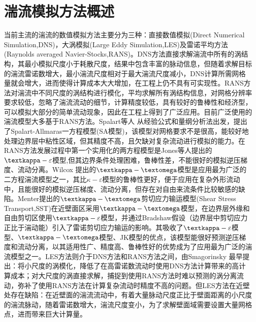 \section{湍流模拟方法概述}
当前主流的湍流的数值模拟方法主要分为三种：直接数值模拟(Direct Numerical Simulation,DNS)，大涡模拟(Large Eddy Simulation,LES)及雷诺平均方法(Raynolds averaged Navier-Stocks,RANS)。DNS方法直接求解湍流中所有的涡结构，其最小模拟尺度小于耗散尺度，结果中包含丰富的脉动信息，但随着求解目标的湍流雷诺数增大，最小湍流尺度相对于最大湍流尺度减小，DNS计算所需网格量就会增大，进而使得计算成本大大增加，在工程上仍不具有可实现性。RANS方法对湍流中不同尺度的涡结构进行模化，平均求解所有涡结构信息，对网格分辨率要求较低，忽略了湍流流动的细节，计算精度较低，具有较好的鲁棒性和经济型，可以模拟大部分的简单流动现象，因此在工程上得到了广泛应用。目前广泛使用的湍流模型大多基于RANS方法。Spalart等人 从经验公式和量纲分析法出发，提出了Spalart-Allmaras一方程模型(SA模型)，该模型对网格要求不是很高，能较好地处理边界层中粘性区域，但其精度不高，且欠缺对复杂流动进行模拟的能力。在RANS方法发展过程中第一个实用化的两方程模型是Jones等人提出的$\textkappa-\varepsilon$模型,但其边界条件处理困难，鲁棒性差，不能很好的模拟逆压梯度、流动分离。Wilcox 提出的$\textkappa-\textomega$模型是应用最为广泛的二方程湍流模型之一，其比$\kappa-\varepsilon$模型的鲁棒性更好，便于应用在复杂外形流动中，且能很好的模拟逆压梯度、流动分离，但存在对自由来流条件比较敏感的缺陷。Menter提出的$\textkappa-\textomega$剪切应力输运模型(Shear Stress Transport,SST)在近壁面区采用$\textkappa-\textomega$模型，在边界层外缘和自由剪切区使用$\textkappa-\varepsilon$模型，并通过Bradshaw假设（边界层中剪切应力正比于湍动能）引入了雷诺剪切应力输运的影响。其吸收了$\textkappa-\varepsilon$模型、$\textkappa-\textomega$模型、JK模型的优点，该模型能很好预测逆压梯度和流动分离，以其适用性广、精度高、鲁棒性好的优势成为了应用最为广泛的湍流模型之一。LES方法则介于DNS方法和RANS方法之间，由Smagorinsky 最早提出：将小尺度的涡模化，降低了在高雷诺数流动时使用DNS方法计算带来的高计算成本；对大尺度的涡直接求解，捕捉到使用RANS方法时难以预测的涡分离流动，弥补了使用RANS方法在计算复杂流动时精度不高的问题。但LES方法在近壁处存在缺陷：在近壁面的湍流流动中，有着大量脉动尺度正比于壁面距离的小尺度的湍流脉动，随着雷诺数增大，湍流尺度变小，为了求解壁面域需要设置大量网格点，进而带来巨大计算量。
